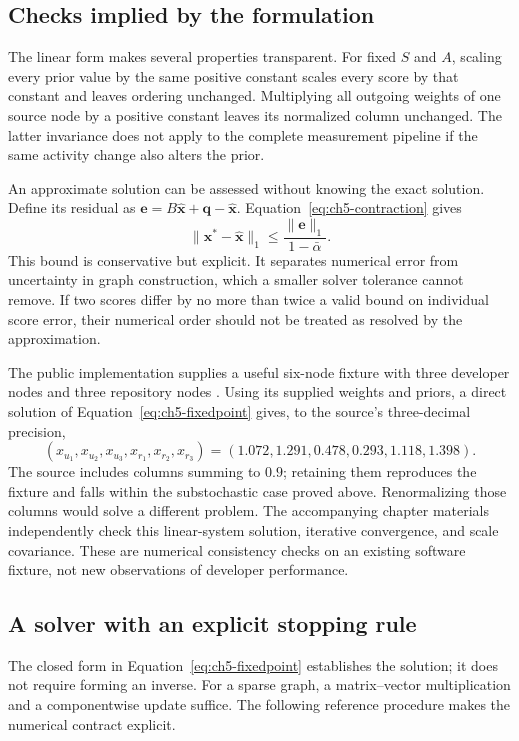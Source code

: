 \subsection{Checks implied by the formulation}
The linear form makes several properties transparent. For fixed \(S\) and \(A\), scaling every prior value by the same positive constant scales every score by that constant and leaves ordering unchanged. Multiplying all outgoing weights of one source node by a positive constant leaves its normalized column unchanged. The latter invariance does not apply to the complete measurement pipeline if the same activity change also alters the prior.

An approximate solution can be assessed without knowing the exact solution. Define its residual as \(\boldsymbol e=B\widehat{\boldsymbol x}+\boldsymbol q-\widehat{\boldsymbol x}\). Equation~\ref{eq:ch5-contraction} gives
\begin{equation}
 \lVert\boldsymbol x^*-\widehat{\boldsymbol x}\rVert_1
 \leq\frac{\lVert\boldsymbol e\rVert_1}{1-\bar\alpha}.
 \label{eq:ch5-residual}
\end{equation}
This bound is conservative but explicit. It separates numerical error from uncertainty in graph construction, which a smaller solver tolerance cannot remove. If two scores differ by no more than twice a valid bound on individual score error, their numerical order should not be treated as resolved by the approximation.

The public implementation supplies a useful six-node fixture with three developer nodes and three repository nodes \citep{openrankgds2023}. Using its supplied weights and priors, a direct solution of Equation~\ref{eq:ch5-fixedpoint} gives, to the source's three-decimal precision,
\[
 (x_{u_1},x_{u_2},x_{u_3},x_{r_1},x_{r_2},x_{r_3})
 =(1.072,1.291,0.478,0.293,1.118,1.398).
\]
The source includes columns summing to \(0.9\); retaining them reproduces the fixture and falls within the substochastic case proved above. Renormalizing those columns would solve a different problem. The accompanying chapter materials independently check this linear-system solution, iterative convergence, and scale covariance. These are numerical consistency checks on an existing software fixture, not new observations of developer performance.

\subsection{A solver with an explicit stopping rule}
The closed form in Equation~\ref{eq:ch5-fixedpoint} establishes the solution; it does not require forming an inverse. For a sparse graph, a matrix--vector multiplication and a componentwise update suffice. The following reference procedure makes the numerical contract explicit.

